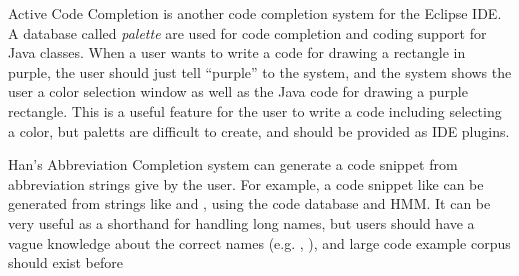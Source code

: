 \documentclass{sigchi}
\begin{document}
Active Code Completion\cite{Omar:2012:ACC:2337223.2337324}
is another code completion system for the Eclipse IDE.
A database called \textit{palette} are used for code completion and coding support
for Java classes.
When a user wants to write a code for drawing a rectangle in purple,
the user should just tell ``purple'' to the system,
and the system shows the user a color selection window
as well as the Java code for drawing a purple rectangle.
This is a useful feature for the user to write a code including selecting
a color, but paletts are difficult to create, and should be provided
as IDE plugins.

Han's Abbreviation Completion system\cite{Han:2009:CCA:1747491.1747530}
can generate a code snippet from abbreviation strings give by the user.
For example, a code snippet like 
can be generated from strings like
 and , using the code database and HMM.
It can be very useful as a shorthand for handling long names,
but users should have a vague knowledge about the correct names
(e.g. , ),
and large code example corpus should exist before

\end{document}
